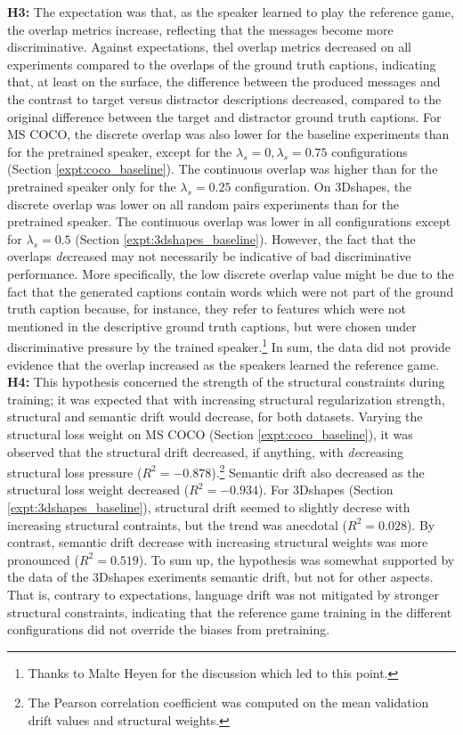 \textbf{H3:} The expectation was that, as the speaker learned to play the reference game, the overlap metrics increase, reflecting that the messages become more discriminative. Against expectations, thel overlap metrics decreased on all experiments compared to the overlaps of the ground truth captions, indicating that, at least on the surface, the difference between the produced messages and the contrast to target versus distractor descriptions decreased, compared to the original difference between the target and distractor ground truth captions. For MS COCO, the discrete overlap was also lower for the baseline experiments than for the pretrained speaker, except for the $\lambda_s = 0, \lambda_s = 0.75$ configurations (Section \ref{expt:coco_baseline}). The continuous overlap was higher than for the pretrained speaker only for the $\lambda_s = 0.25$ configuration.
On 3Dshapes, the discrete overlap was lower on all random pairs experiments than for the pretrained speaker. The continuous overlap was lower in all configurations except for $\lambda_s=0.5$ (Section \ref{expt:3dshapes_baseline}). However, the fact that the overlaps \emph{de}creased may not necessarily be indicative of bad discriminative performance. More specifically, the low discrete overlap value might be due to the fact that the generated captions contain words which were not part of the ground truth caption because, for instance, they refer to features which were not mentioned in the descriptive ground truth captions, but were chosen under discriminative pressure by the trained speaker.\footnote{Thanks to Malte Heyen for the discussion which led to this point.} 
In sum, the data did not provide evidence that the overlap increased as the speakers learned the reference game.\newline
\textbf{H4:} This hypothesis concerned the strength of the structural constraints during training; it was expected that with increasing structural regularization strength, structural and semantic drift would decrease, for both datasets. Varying the structural loss weight on MS COCO (Section \ref{expt:coco_baseline}), it was observed that the structural drift decreased, if anything, with \textit{de}creasing structural loss pressure ($R^2 = -0.878$).\footnote{The Pearson correlation coefficient was computed on the mean validation drift values and structural weights.} Semantic drift also decreased as the structural loss weight decreased ($R^2 = -0.934$). For 3Dshapes (Section \ref{expt:3dshapes_baseline}), structural drift seemed to slightly decrese with increasing structural contraints, but the trend was anecdotal ($R^2=0.028$). By contrast, semantic drift decrease with increasing structural weights was more pronounced ($R^2 = 0.519$). To sum up, the hypothesis was somewhat supported by the data of the 3Dshapes exeriments semantic drift, but not for other aspects. That is, contrary to expectations, language drift was not mitigated by stronger structural constraints, indicating that the reference game training in the different configurations did not override the biases from pretraining.  \newline
